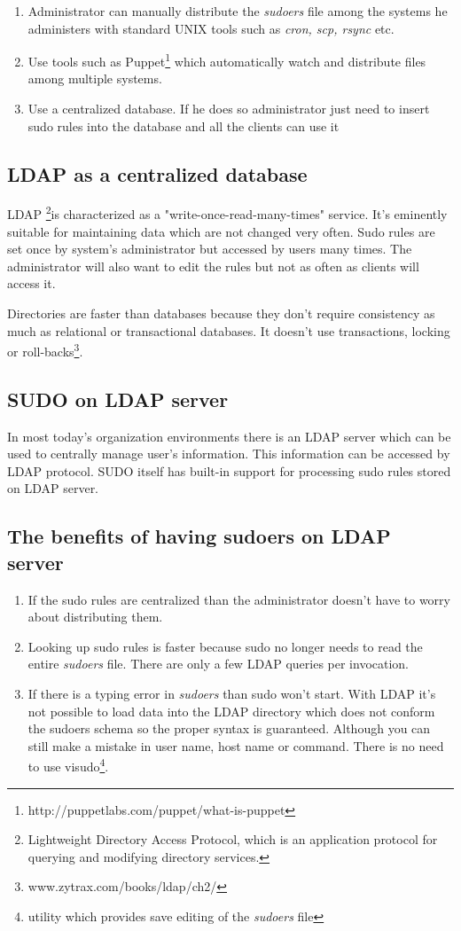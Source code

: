 \documentclass[12pt,a4paper,titlepage,final]{article}
\begin{document}
\begin{enumerate} 
	\item Administrator can manually distribute the \emph{sudoers} file among the
		systems he administers with standard UNIX tools such as \emph{cron, scp,
		rsync} etc.
	\item Use tools such as
		Puppet\footnote{http://puppetlabs.com/puppet/what-is-puppet} which
		automatically watch and distribute files among multiple systems.
	\item Use a centralized database. If he does so administrator just need to
		insert sudo rules into the database and all the clients can use it
\end{enumerate}

\subsection{LDAP as a centralized database}
LDAP \footnote{Lightweight Directory Access Protocol, which is an application
protocol for querying and modifying directory services.}is characterized as a
"write-once-read-many-times" service. It's eminently suitable for maintaining
data which are not changed very often. Sudo rules are set once by system's
administrator but accessed by users many times. The administrator will also want
to edit the rules but not as often as clients will access it.

Directories are faster than databases because they don't require consistency as
much as relational or transactional databases. It doesn't use transactions,
locking or roll-backs\footnote{www.zytrax.com/books/ldap/ch2/}.


\subsection{SUDO on LDAP server}
In most today's organization environments there is an LDAP server which can be
used to centrally manage user's information. This information can be accessed
by LDAP protocol. SUDO itself has built-in support for processing sudo rules
stored on LDAP server.


\subsection{The benefits of having sudoers on LDAP server}
\begin{enumerate} 
	\item If the sudo rules are centralized than the administrator doesn't have to
		worry about distributing them.
	\item Looking up sudo rules is faster because sudo no longer needs to read
		the entire \emph{sudoers} file. There are only a few LDAP queries per
		invocation.
	\item If there is a typing error in \emph{sudoers} than sudo won't start. With
		LDAP it's not possible to load data into the LDAP directory which does not
		conform the sudoers schema so the proper syntax is guaranteed. Although you
		can still make a mistake in user name, host name or command. There is no
		need to use visudo\footnote{utility which provides save editing of the
		\emph{sudoers} file}.
\end{enumerate}
\end{document}
